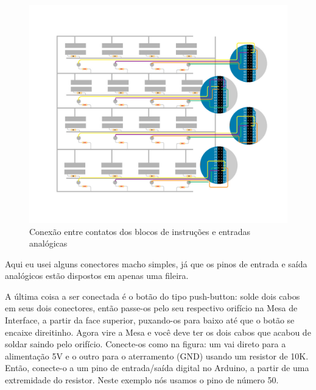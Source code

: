 \documentclass[paper=a4, fontsize=11pt]{scrartcl} %
\numberwithin{equation}{section} %
\numberwithin{figure}{section} %
\numberwithin{table}{section} %
\begin{document}
\begin{figure}[H] %
  \centering
  \includegraphics[scale=0.15]{./imagens/board-8.jpg}
  \caption[ ]{Conexão entre contatos dos blocos de instruções e entradas analógicas }
  \label{fig:conexão contato analog-in}
\end{figure}

Aqui eu usei alguns conectores macho simples, já que os pinos de entrada e saída analógicos estão dispostos em apenas uma fileira.

A última coisa a ser conectada é o botão do tipo push-button: solde dois cabos em seus dois conectores, então passe-os pelo seu respectivo orifício na Mesa de Interface, a partir da face superior, puxando-os para baixo até que o botão se encaixe direitinho. Agora vire a Mesa e você deve ter os dois cabos que acabou de soldar saindo pelo orifício. Conecte-os como na figura: um vai direto para a alimentação 5V e o outro para o aterramento (GND) usando um resistor de 10K. Então, conecte-o a um pino de entrada/saída digital no Arduino, a partir de uma extremidade do resistor. Neste exemplo nós usamos o pino de número 50.
\end{document}
